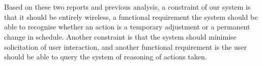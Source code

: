 \\\\
Based on these two reports and previous analysis, a constraint of our system is that it should be entirely wireless, a functional requirement the system should be able to recognise whether an action is a temporary adjustment or a permanent change in schedule. Another constraint is that the system should minimise solicitation of user interaction, and another functional requirement is the user should be able to query the system of reasoning of actions taken.
